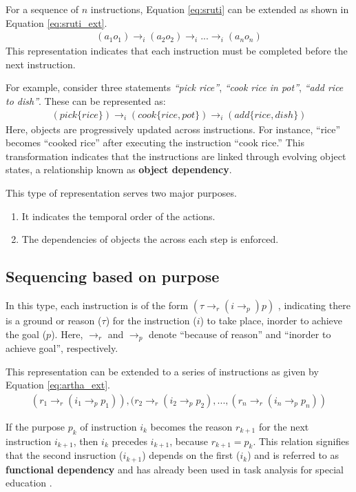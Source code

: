 \documentclass[a4paper,11pt]{lmcs}
\begin{document}
For a sequence of $n$ instructions, Equation \ref{eq:sruti} can be extended as shown in Equation \ref{eq:sruti_ext}.
\begin{eqnarray}
 \label{eq:sruti_ext}
 (a_1o_1) \rightarrow_i (a_2o_2) \rightarrow_i ... \rightarrow_i (a_no_n)
\end{eqnarray}
This representation indicates that each instruction must be completed before the next instruction.

For example, consider three statements \textit{``pick rice''}, \textit{``cook rice in pot''}, \textit{``add rice to dish''}. These can be represented as:
\begin{eqnarray}
 (pick \{rice\}) \rightarrow_i (cook \{rice,
 pot\}) \rightarrow_i (add \{rice,dish\})
\end{eqnarray}
Here, objects are progressively updated across instructions. For instance, “rice” becomes “cooked rice” after executing the instruction “cook rice.” This transformation indicates that the instructions are linked through evolving object states, a relationship known as \textbf{object dependency}.

This type of representation serves two major purposes.

\begin{enumerate}
 \item It indicates the temporal order of the actions.
 \item The dependencies of objects the across each step is enforced.
\end{enumerate}
\subsection{Sequencing based on purpose}
\label{sec:artha}
In this type, each instruction is of the form $(\tau \rightarrow_r (i \rightarrow_p) p)$ \cite{llm_mira}, indicating there is a ground or reason ($\tau$) for the instruction ($i$) to take place, inorder to achieve the goal ($p$). Here, $\rightarrow_r$ and $\rightarrow_p$ denote ``because of reason'' and ``inorder to achieve  goal'', respectively.

This representation can be extended to a series of instructions as given by Equation \ref{eq:artha_ext}.
\begin{eqnarray}
 \label{eq:artha_ext}
 (r_1 \rightarrow_r (i_1 \rightarrow_p p_1)), (r_2 \rightarrow_r (i_2 \rightarrow_p p_2), ..., (r_n \rightarrow_r (i_n \rightarrow_p p_n))
\end{eqnarray}

If the purpose $p_k$ of instruction $i_k$ becomes the reason $r_{k+1}$ for the next instruction $i_{k+1}$, then $i_k$ precedes $i_{k+1}$, because $r_{k+1} = p_k$. This relation signifies that the second insruction ($i_{k+1}$) depends on the first ($i_k$) and is referred to as \textbf{functional dependency} and has already been used in task analysis for special education \cite{ta}.
\end{document}
